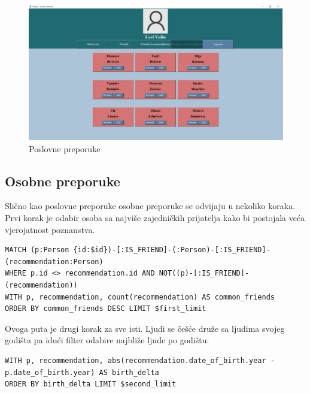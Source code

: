 \documentclass[titlepage, 12pt]{scrartcl}
\begin{document}
\begin{figure}[h]
    \centering
    \includegraphics[scale=0.19]{slike/business.jpg}
    \caption{Poslovne preporuke}
    \label{fig:business_rec}
\end{figure}


\subsection{Osobne preporuke}
Slično kao poslovne preporuke osobne preporuke se odvijaju u nekoliko koraka. \\
Prvi korak je odabir osoba sa najviše zajedničkih prijatelja kako bi postojala veća vjerojatnost poznanstva.
\begin{samepage}
\begin{verbatim}
MATCH (p:Person {id:$id})-[:IS_FRIEND]-(:Person)-[:IS_FRIEND]-(recommendation:Person)
WHERE p.id <> recommendation.id AND NOT((p)-[:IS_FRIEND]-(recommendation))
WITH p, recommendation, count(recommendation) AS common_friends
ORDER BY common_friends DESC LIMIT $first_limit

\end{verbatim}
\end{samepage}
Ovoga puta je drugi korak za sve isti. Ljudi se češće druže sa ljudima svojeg godišta pa idući filter odabire najbliže ljude po godištu:
\begin{samepage}
\begin{verbatim}
WITH p, recommendation, abs(recommendation.date_of_birth.year - p.date_of_birth.year) AS birth_delta 
ORDER BY birth_delta LIMIT $second_limit

\end{verbatim}
\end{samepage}
\end{document}
